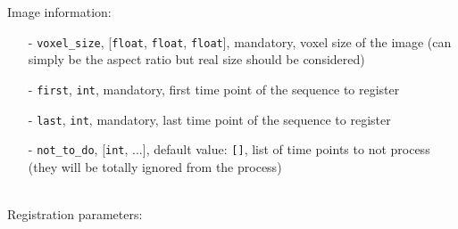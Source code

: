 \documentclass[10pt,a4paper]{book}
\begin{document}
Image information:
\begin{itemize}
\item[-] \texttt{voxel\_size}, [\texttt{float}, \texttt{float}, \texttt{float}], mandatory, voxel size of the image (can simply be the aspect ratio but real size should be considered)
\item[-] \texttt{first}, \texttt{int}, mandatory, first time point of the sequence to register
\item[-] \texttt{last}, \texttt{int}, mandatory, last time point of the sequence to register
\item[-] \texttt{not\_to\_do}, [\texttt{int}, ...], default value: \texttt{[]}, list of time points to not process (they will be totally ignored from the process)
\end{itemize}~\\
Registration parameters:
\end{document}
